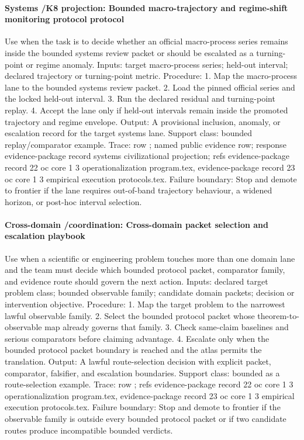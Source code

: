 \paragraph{Systems /\allowbreak K8 projection: Bounded macro-trajectory and regime-shift monitoring protocol protocol}
Use when the task is to decide whether an official macro-process series remains inside the bounded systems review packet or should be escalated as a turning-point or regime anomaly.
Inputs: target macro-process series; \allowbreak held-out interval; \allowbreak declared trajectory or turning-point metric.
Procedure: 1. Map the macro-process lane to the bounded systems review packet. 2. Load the pinned official series and the locked held-out interval. 3. Run the declared residual and turning-point replay. 4. Accept the lane only if held-out intervals remain inside the promoted trajectory and regime envelope.
Output: A provisional inclusion, anomaly, or escalation record for the target systems lane.
Support class: bounded replay/comparator example.
Trace: row ; named public evidence row; \allowbreak response evidence-package record systems civilizational projection; \allowbreak refs evidence-package record 22 oc core 1 3 operationalization program.tex, \allowbreak evidence-package record 23 oc core 1 3 empirical execution protocols.tex.
Failure boundary: Stop and demote to frontier if the lane requires out-of-band trajectory behaviour, a widened horizon, or post-hoc interval selection.

\paragraph{Cross-domain /\allowbreak coordination: Cross-domain packet selection and escalation playbook}
Use when a scientific or engineering problem touches more than one domain lane and the team must decide which bounded protocol packet, comparator family, and evidence route should govern the next action.
Inputs: declared target problem class; \allowbreak bounded observable family; \allowbreak candidate domain packets; \allowbreak decision or intervention objective.
Procedure: 1. Map the target problem to the narrowest lawful observable family. 2. Select the bounded protocol packet whose theorem-to-observable map already governs that family. 3. Check same-claim baselines and serious comparators before claiming advantage. 4. Escalate only when the bounded protocol packet boundary is reached and the atlas permits the translation.
Output: A lawful route-selection decision with explicit packet, comparator, falsifier, and escalation boundaries.
Support class: bounded as a route-selection example.
Trace: row ; \allowbreak refs evidence-package record 22 oc core 1 3 operationalization program.tex, \allowbreak evidence-package record 23 oc core 1 3 empirical execution protocols.tex.
Failure boundary: Stop and demote to frontier if the observable family is outside every bounded protocol packet or if two candidate routes produce incompatible bounded verdicts.

